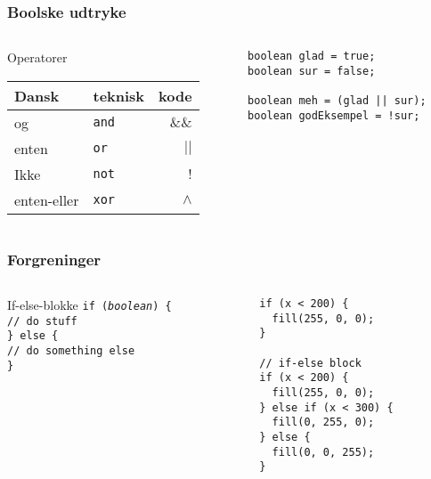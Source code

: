 \documentclass{beamer}
\begin{document}
\begin{frame}[fragile]
  \frametitle{Boolske udtryke}
  \begin{columns}
    \begin{column}{0.5\textwidth}
      \begin{block}{Operatorer}
        \begin{table}[h]
          \centering
          \begin{tabular}{llr}
            Dansk & teknisk & kode \\
            \hline
            og & \texttt{and} & $\&\&$ \\
            enten & \texttt{or} & $|| $\\
            Ikke & \texttt{not} & $!$\\
            enten-eller & \texttt{xor} & $\wedge$\\
          \end{tabular}
        \end{table}
      \end{block}
    \end{column}
    \begin{column}{0.5\textwidth}
\begin{verbatim} 
boolean glad = true;
boolean sur = false;

boolean meh = (glad || sur);
boolean godEksempel = !sur;

\end{verbatim}
    \end{column}
  \end{columns}
\end{frame}


\begin{frame}[fragile]
  \frametitle{Forgreninger}
  \begin{columns}
    \begin{column}{0.5\textwidth}
      \begin{block}{If-else-blokke}
        \texttt{if (\emph{boolean}) \{ }\\
        \texttt{// do stuff} \\
        \texttt{\} else \{ } \\
        \texttt{// do something else} \\
        \texttt{\}}\\
        \vspace{1cm}
      \end{block}
    \end{column}
    \begin{column}{0.5\textwidth}
\begin{verbatim} 
if (x < 200) {
  fill(255, 0, 0);
}

// if-else block
if (x < 200) {
  fill(255, 0, 0);
} else if (x < 300) {
  fill(0, 255, 0);
} else {
  fill(0, 0, 255);
}
\end{verbatim}
    \end{column}
  \end{columns}
\end{frame}
\end{document}
